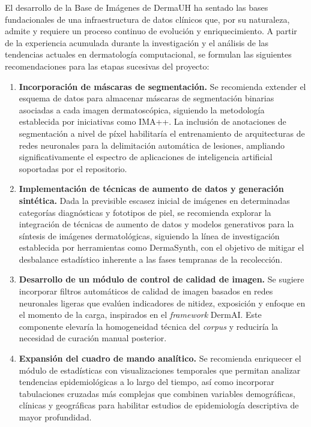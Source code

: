 \begin{recomendations}
El desarrollo de la Base de Imágenes de DermaUH ha sentado las bases fundacionales de una infraestructura 
de datos clínicos que, por su naturaleza, admite y requiere un proceso continuo de evolución y 
enriquecimiento. A partir de la experiencia acumulada durante la investigación y el análisis de 
las tendencias actuales en dermatología computacional, se formulan las siguientes recomendaciones 
para las etapas sucesivas del proyecto:

\begin{enumerate}
    \item \textbf{Incorporación de máscaras de segmentación.} Se recomienda extender el esquema de datos 
    para almacenar máscaras de segmentación binarias asociadas a cada imagen dermatoscópica, siguiendo la 
    metodología establecida por iniciativas como IMA++. La inclusión de anotaciones de segmentación a 
    nivel de píxel habilitaría el entrenamiento de arquitecturas de redes neuronales para la delimitación 
    automática de lesiones, ampliando significativamente el espectro de aplicaciones de inteligencia 
    artificial soportadas por el repositorio.

    \item \textbf{Implementación de técnicas de aumento de datos y generación sintética.} Dada la 
    previsible escasez inicial de imágenes en determinadas categorías diagnósticas y fototipos de piel, 
    se recomienda explorar la integración de técnicas de aumento de datos y modelos generativos para la 
    síntesis de imágenes dermatológicas, siguiendo la línea de investigación establecida por herramientas 
    como DermaSynth, con el objetivo de mitigar el desbalance estadístico inherente a las fases tempranas 
    de la recolección.

    \item \textbf{Desarrollo de un módulo de control de calidad de imagen.} Se sugiere incorporar filtros 
    automáticos de calidad de imagen basados en redes neuronales ligeras que evalúen indicadores de 
    nitidez, exposición y enfoque en el momento de la carga, inspirados en el \textit{framework} DermAI. 
    Este componente elevaría la homogeneidad técnica del \textit{corpus} y reduciría la necesidad de 
    curación manual posterior.

    \item \textbf{Expansión del cuadro de mando analítico.} Se recomienda enriquecer el módulo de 
    estadísticas con visualizaciones temporales que permitan analizar tendencias epidemiológicas a lo 
    largo del tiempo, así como incorporar tabulaciones cruzadas más complejas que combinen variables 
    demográficas, clínicas y geográficas para habilitar estudios de epidemiología descriptiva de mayor 
    profundidad.


\end{enumerate}
\end{recomendations}
